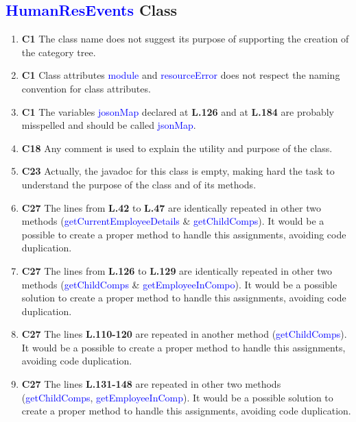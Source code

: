 \subsection{\textcolor{blue}{HumanResEvents} Class}

\begin{enumerate}
	\item \textbf{C1} The class name does not suggest its purpose of supporting
		the creation of the category tree.

	\item \textbf{C1} Class attributes \textcolor{blue}{module} and
		\textcolor{blue}{resourceError} does not respect the naming convention for
		class attributes.

	\item \textbf{C1} The variables \textcolor{blue}{josonMap} declared at
		\textbf{L.126} and at \textbf{L.184} are probably misspelled and should be
		called \textcolor{blue}{jsonMap}.

	\item \textbf{C18} Any comment is used to explain the utility and purpose of
		the class.

	\item \textbf{C23} Actually, the javadoc for this class is empty, making hard
		the task to understand the purpose of the class and of its methods.

	\item \textbf{C27} The lines from \textbf{L.42} to \textbf{L.47} are
		identically repeated in other two methods
		(\textcolor{blue}{getCurrentEmployeeDetails} \&
		\textcolor{blue}{getChildComps}). It would be a possible to create a proper
		method to handle this assignments, avoiding code duplication.

	\item \textbf{C27} The lines from \textbf{L.126} to \textbf{L.129} are
		identically repeated in other two methods (\textcolor{blue}{getChildComps}
		\& \textcolor{blue}{getEmployeeInCompo}). It would be a possible solution to
		create a proper method to handle this assignments, avoiding code duplication.

	\item \textbf{C27} The lines \textbf{L.110-120} are repeated in another method
		(\textcolor{blue}{getChildComps}). It would be a possible to create a proper
		method to handle this assignments, avoiding code duplication.

	\item \textbf{C27} The lines \textbf{L.131-148} are repeated in other two
		methods (\textcolor{blue}{getChildComps},
		\textcolor{blue}{getEmployeeInComp}). It would be a possible solution to
		create a proper method to handle this assignments, avoiding code duplication.

\end{enumerate}
